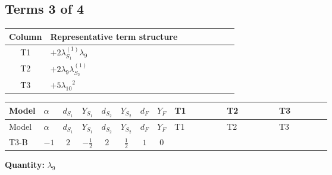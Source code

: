 \documentclass[8pt]{article}
\begin{document}
\begin{landscape}
\subsection*{Terms 3 of 4}
\begin{center}
\begin{tabular}{@{}c >{\raggedright\arraybackslash}p{0.82\linewidth}@{}}
\toprule
Column & Representative term structure \\
\midrule
T1 & \(\displaystyle +2 {\lambda_{S_1}^{(1)}} {\lambda_9}\) \\
\midrule
T2 & \(\displaystyle +2 {\lambda_9} {\lambda_{S_2}^{(1)}}\) \\
\midrule
T3 & \(\displaystyle +5 {\lambda_{10}}^2\) \\
\midrule
\bottomrule
\end{tabular}
\end{center}
\smallskip
\tiny
\begin{longtable}{@{}llcccccc >{\raggedright\arraybackslash}p{0.21\linewidth} >{\raggedright\arraybackslash}p{0.21\linewidth} >{\raggedright\arraybackslash}p{0.21\linewidth}@{}}
\toprule
Model & $\alpha$ & $d_{S_1}$ & $Y_{S_1}$ & $d_{S_2}$ & $Y_{S_2}$ & $d_F$ & $Y_F$ & T1 & T2 & T3 \\
\midrule
\endfirsthead
\toprule
Model & $\alpha$ & $d_{S_1}$ & $Y_{S_1}$ & $d_{S_2}$ & $Y_{S_2}$ & $d_F$ & $Y_F$ & T1 & T2 & T3 \\
\midrule
\endhead
T3-B & $-1$ & $2$ & $-\frac{1}{2}$ & $2$ & $\frac{1}{2}$ & $1$ & $0$ & \scriptsize\adjustbox{max width=\linewidth}{$\begin{gathered} +2 {\lambda_{S_1}^{(1)}} {\lambda_9}\end{gathered}$} & \scriptsize\adjustbox{max width=\linewidth}{$\begin{gathered} +2 {\lambda_9} {\lambda_{S_2}^{(1)}}\end{gathered}$} & \scriptsize\adjustbox{max width=\linewidth}{$\begin{gathered} +5 {\lambda_{10}}^2 \\ +5 {\lambda_{11}}^2\end{gathered}$} \\
\midrule
\bottomrule
\end{longtable}
\clearpage
\noindent\textbf{Quantity: }$\lambda_{9}$\par\smallskip

\end{landscape}
\end{document}
